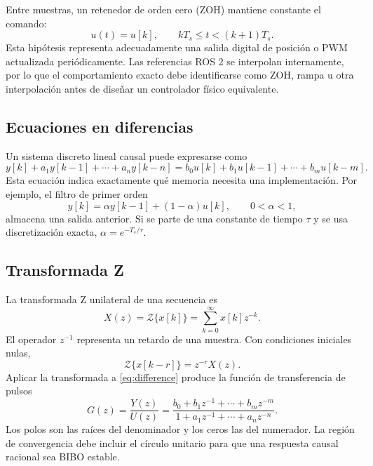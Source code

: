 \documentclass[11pt,letterpaper]{article}
\begin{document}
Entre muestras, un retenedor de orden cero (ZOH) mantiene constante el comando:
\begin{equation}
 u(t)=u[k],\qquad kT_s\le t<(k+1)T_s.
 \label{eq:zoh}
\end{equation}
Esta hipótesis representa adecuadamente una salida digital de posición o PWM
actualizada periódicamente. Las referencias ROS 2 se interpolan internamente,
por lo que el comportamiento exacto debe identificarse como ZOH, rampa u otra
interpolación antes de diseñar un controlador físico equivalente.

\subsection{Ecuaciones en diferencias}
Un sistema discreto lineal causal puede expresarse como
\begin{equation}
 y[k]+a_1y[k-1]+\cdots+a_ny[k-n]
 =b_0u[k]+b_1u[k-1]+\cdots+b_mu[k-m].
 \label{eq:difference}
\end{equation}
Esta ecuación indica exactamente qué memoria necesita una implementación. Por
ejemplo, el filtro de primer orden
\begin{equation}
 y[k]=\alpha y[k-1]+(1-\alpha)u[k],\qquad 0<\alpha<1,
\end{equation}
almacena una salida anterior. Si se parte de una constante de tiempo $\tau$ y
se usa discretización exacta, $\alpha=e^{-T_s/\tau}$.

\subsection{Transformada Z}
La transformada Z unilateral de una secuencia es
\begin{equation}
 X(z)=\mathcal Z\{x[k]\}=\sum_{k=0}^{\infty}x[k]z^{-k}.
 \label{eq:ztransform}
\end{equation}
El operador $z^{-1}$ representa un retardo de una muestra. Con condiciones
iniciales nulas,
\begin{equation}
 \mathcal Z\{x[k-r]\}=z^{-r}X(z).
\end{equation}
Aplicar la transformada a \cref{eq:difference} produce la función de
transferencia de pulsos
\begin{equation}
 G(z)=\frac{Y(z)}{U(z)}=
 \frac{b_0+b_1z^{-1}+\cdots+b_mz^{-m}}
 {1+a_1z^{-1}+\cdots+a_nz^{-n}}.
 \label{eq:pulse-transfer}
\end{equation}
Los polos son las raíces del denominador y los ceros las del numerador. La
región de convergencia debe incluir el círculo unitario para que una respuesta
causal racional sea BIBO estable.
\end{document}
